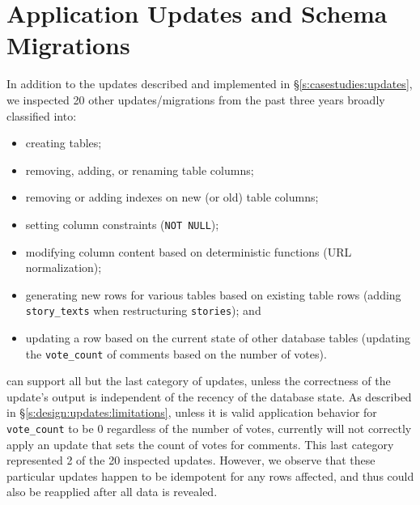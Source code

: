 




\section{Application Updates and Schema Migrations}
\label{s:eval:updates}
%
In addition to the updates described and implemented in
\S\ref{s:casestudies:updates}, we inspected 20 other updates/migrations from the
past three years broadly classified into: 
\begin{itemize}[nosep] 
    \item creating
        tables; 
    \item removing, adding, or renaming table columns; 
        \item
        removing or adding indexes on new (or old) table columns; 
    \item setting
        column constraints (\eg \texttt{NOT NULL}); 
    \item modifying column
            content based on deterministic functions (\eg URL normalization);
    \item generating new rows for various tables based on existing table
        rows (\eg adding \texttt{story\_texts}  when restructuring \texttt{stories}); and 
    \item updating a row based on the current state of other database tables
        (\eg updating the \texttt{vote\_count} of comments based on the number
        of votes).  
\end{itemize}
%
\sys can support all but the last category of updates, unless the correctness of
the update's output is independent of the recency of the database state. As
described in \S\ref{s:design:updates:limitations}, unless it is valid
application behavior for \eg \texttt{vote\_count} to be 0 regardless of the
number of votes, \sys currently will not correctly apply an update that sets the
count of votes for comments. This last category represented 2 of the 20
inspected updates. However, we observe that these particular updates happen to
be idempotent for any rows affected, and thus could also be reapplied after all
data is revealed.
%

